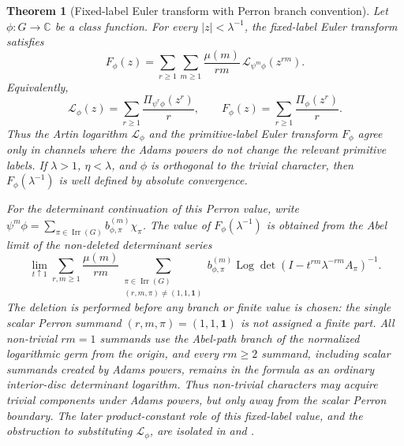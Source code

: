\documentclass[11pt,a4paper]{amsart}
\theoremstyle{plain}
\newtheorem{theorem}{Theorem}[section]
\theoremstyle{definition}
\theoremstyle{remark}
\DeclareMathOperator{\Irr}{Irr}
\DeclareMathOperator{\Log}{Log}
\newcommand{\CC}{\mathbb{C}}
\begin{document}
\begin{theorem}[Fixed-label Euler transform with Perron branch convention]
  \label{thm:fixed-label-euler-transform}
  Let \(\phi:G\to\CC\) be a class function. For every
  \(|z|<\lambda^{-1}\), the fixed-label Euler transform satisfies
  \begin{equation}\label{eq:fixed-label-euler-transform-adams-mobius}
    F_\phi(z)
    =
    \sum_{r\ge1}\sum_{m\ge1}
      \frac{\mu(m)}{rm}\,
      \mathcal L_{\psi^m\phi}(z^{rm}).
  \end{equation}
  Equivalently,
  \begin{equation}\label{eq:fixed-label-euler-transform-vs-artin}
    \mathcal L_\phi(z)
    =
    \sum_{r\ge1}\frac{\Pi_{\psi^r\phi}(z^r)}{r},
    \qquad
    F_\phi(z)
    =
    \sum_{r\ge1}\frac{\Pi_\phi(z^r)}{r}.
  \end{equation}
  Thus the Artin logarithm \(\mathcal L_\phi\) and the primitive-label
  Euler transform \(F_\phi\) agree only in channels where the Adams powers
  do not change the relevant primitive labels. If \(\lambda>1\),
  \(\eta<\lambda\), and \(\phi\) is orthogonal to the trivial character,
  then \(F_\phi(\lambda^{-1})\) is well defined by absolute convergence.

  For the determinant continuation of this Perron value, write
  \(\psi^m\phi=\sum_{\pi\in\Irr(G)}b_{\phi,\pi}^{(m)}\chi_\pi\).  The value of
  \(F_\phi(\lambda^{-1})\) is obtained from the Abel limit of the non-deleted
  determinant series
  \begin{equation}\label{eq:fixed-label-euler-transform-perron-branch-series}
    \lim_{t\uparrow1}
    \sum_{r,m\ge1}\frac{\mu(m)}{rm}
      \sum_{\substack{\pi\in\Irr(G)\\(r,m,\pi)\neq(1,1,\mathbf1)}}
        b_{\phi,\pi}^{(m)}
        \Log\det(I-t^{rm}\lambda^{-rm}A_\pi)^{-1}.
  \end{equation}
  The deletion is performed before any branch or finite value is chosen: the
  single scalar Perron summand \((r,m,\pi)=(1,1,\mathbf1)\) is not assigned a
  finite part.  All non-trivial \(rm=1\) summands use the Abel-path branch of
  the normalized logarithmic germ from the origin, and every \(rm\ge2\)
  summand, including scalar summands created by Adams powers, remains in the
  formula as an ordinary interior-disc determinant logarithm.  Thus
  non-trivial characters may acquire trivial components under Adams powers, but
  only away from the scalar Perron boundary.  The later product-constant role
  of this fixed-label value, and the obstruction to substituting
  \(\mathcal L_\phi\), are isolated in
   and
  .
\end{theorem}
\end{document}
